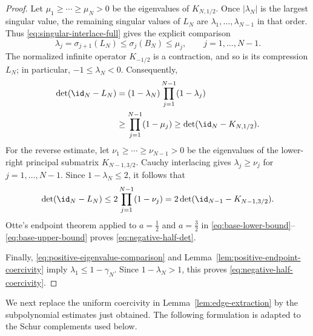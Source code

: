 \begin{proof}
Let $\mu_1\ge\cdots\ge\mu_N>0$ be the eigenvalues of $K_{N,1/2}$.  Once
$|\lambda_N|$ is the largest singular value, the remaining singular values of
$L_N$ are $\lambda_1,\ldots,\lambda_{N-1}$ in that order.  Thus
\eqref{eq:singular-interlace-full} gives the explicit comparison
\begin{equation}\label{eq:positive-eigenvalue-comparison}
 \lambda_j=\sigma_{j+1}(L_N)
 \le\sigma_j(B_N)
 \le\mu_j,
 \qquad j=1,\ldots,N-1.
\end{equation}
The normalized infinite operator $K_{-1/2}$ is a contraction, and so is its
compression $L_N$; in particular, $-1\le\lambda_N<0$.  Consequently,
\begin{align}
 \det(\id_N-L_N)
 &=(1-\lambda_N)\prod_{j=1}^{N-1}(1-\lambda_j)\notag\\
 &\ge\prod_{j=1}^{N-1}(1-\mu_j)
 \ge\det(\id_N-K_{N,1/2}).
 \label{eq:base-lower-bound}
\end{align}
For the reverse estimate, let
$\nu_1\ge\cdots\ge\nu_{N-1}>0$ be the eigenvalues of the lower-right
principal submatrix $K_{N-1,3/2}$.  Cauchy interlacing gives
$\lambda_j\ge\nu_j$ for $j=1,\ldots,N-1$.  Since
$1-\lambda_N\le2$, it follows that
\begin{equation}\label{eq:base-upper-bound}
 \det(\id_N-L_N)
 \le2\prod_{j=1}^{N-1}(1-\nu_j)
 =2\det(\id_{N-1}-K_{N-1,3/2}).
\end{equation}
Otte's endpoint theorem applied to $a=\frac12$ and $a=\frac32$ in
\eqref{eq:base-lower-bound}--\eqref{eq:base-upper-bound} proves
\eqref{eq:negative-half-det}.

Finally, \eqref{eq:positive-eigenvalue-comparison} and
Lemma~\ref{lem:positive-endpoint-coercivity} imply
$\lambda_1\le1-\gamma_N$.  Since $1-\lambda_N>1$, this proves
\eqref{eq:negative-half-coercivity}.
\end{proof}

We next replace the uniform coercivity in
Lemma~\ref{lem:edge-extraction} by the subpolynomial estimates just obtained.
The following formulation is adapted to the Schur complements used below.

